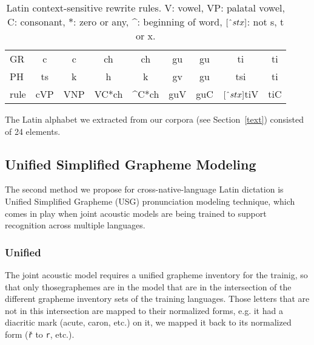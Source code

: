 \documentclass[runningheads,a4paper]{llncs}
\begin{document}
\begin{table}\label{tbl:context}
	\centering
	\caption{Latin context-sensitive rewrite rules. V: vowel, VP: palatal vowel, C: consonant, $*$: zero or any, \string^: beginning of word, $[\string^stx]$: not s, t or x.}
	\begin{tabular}{l|cc|cc|cc|cc}
	\hline
	GR & c & c & ch & ch & gu & gu & ti & ti \\
	PH & ts & k & h & k & gv & gu & tsi & ti \\
	\hline
	rule & \multicolumn{1}{c|}{cVP} & \multicolumn{1}{c|}{VNP} & \multicolumn{1}{c|}{VC*ch} & \multicolumn{1}{c|}{\string^C*ch} & \multicolumn{1}{c|}{guV} & \multicolumn{1}{c|}{guC} & \multicolumn{1}{c|}{$[\string^stx]$tiV} & \multicolumn{1}{c|}{tiC} \\
	\hline
	\end{tabular}
\end{table}

The Latin alphabet we extracted from our corpora (see Section~\ref{text}) consisted of 24 elements.
\subsection{Unified Simplified Grapheme Modeling}\label{usg}
The second method we propose for cross-native-language Latin dictation is Unified Simplified Grapheme (USG) pronunciation modeling technique, which comes in play when joint acoustic models are being trained to support recognition across multiple languages.
\subsubsection{Unified}
The joint acoustic model requires a unified grapheme inventory for the trainig, so that only thosegraphemes are in the model that are in the intersection of the different grapheme inventory sets of the training languages.
Those letters that are not in this intersection are mapped to their normalized forms, e.g. it had a diacritic mark (acute, caron, etc.) on it, we mapped it back to its normalized form (\texttt{\v{r}} to \texttt{r}, etc.).
\end{document}
